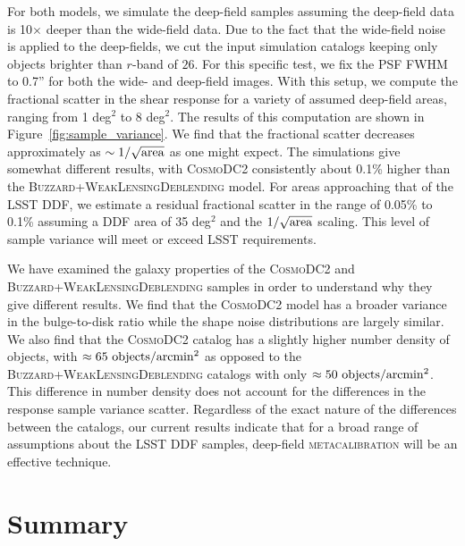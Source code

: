 \documentclass[twocolumn]{openjournal}
\makeatletter
\newcommand{\mcal}{\textsc{metacalibration}\@\xspace}
\newcommand{\descwl}{\textsc{WeakLensingDeblending}\@\xspace}
\newcommand{\cosmodctwo}{\textsc{CosmoDC2}\@\xspace}
\newcommand{\buzzard}{\textsc{Buzzard}\@\xspace}
\makeatother
\begin{document}
For both models, we simulate the deep-field samples assuming the deep-field data is
10$\times$ deeper than the wide-field data. Due to the fact that the wide-field noise is
applied to the deep-fields, we cut the input simulation catalogs keeping only objects
brighter than $r$-band of $26$. For this specific test, we fix the PSF FWHM to 0.7'' for
both the wide- and deep-field images. With this setup, we compute the fractional scatter
in the shear response for a variety of assumed deep-field areas, ranging from 1 deg$^2$
to 8 deg$^2$. The results of this computation are shown in
Figure~\ref{fig:sample_variance}. We find that the fractional scatter decreases
approximately as $\sim1/\sqrt{\rm area}$ as one might expect. The simulations give
somewhat different results, with \cosmodctwo consistently about 0.1\% higher than the
\buzzard+\descwl model. For areas approaching that of the LSST DDF, we estimate a
residual fractional scatter in the range of 0.05\% to 0.1\% assuming a DDF area of 35
deg$^2$ and the $1/\sqrt{\rm area}$ scaling. This level of sample variance will meet or
exceed LSST requirements.

We have examined the galaxy properties of the \cosmodctwo and \buzzard+\descwl samples
in order to understand why they give different results. We find that the \cosmodctwo
model has a broader variance in the bulge-to-disk ratio while the shape noise
distributions are largely similar. We also find that the \cosmodctwo catalog has a
slightly higher number density of objects, with $\approx65\ {\rm objects}/{\rm
arcmin}^2$ as opposed to the \buzzard+\descwl catalogs with only $\approx50\ {\rm
objects}/{\rm arcmin}^2$. This difference in number density does not account for the
differences in the response sample variance scatter. Regardless of the exact nature of
the differences between the catalogs, our current results indicate that for a broad
range of assumptions about the LSST DDF samples, deep-field \mcal will be an effective
technique.


\section{Summary}\label{sec:conc}
\end{document}
